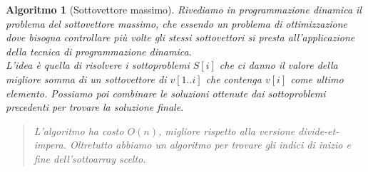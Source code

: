 \documentclass[oneside]{book}
\newtheorem{alg}{Algoritmo}
\begin{document}
\begin{alg}[Sottovettore massimo]
  Rivediamo in programmazione dinamica il problema del sottovettore massimo, che
  essendo un problema di ottimizzazione dove bisogna controllare pi\`u volte gli
  stessi sottovettori si presta all'applicazione della tecnica di programmazione
  dinamica. \\
  L'idea \`e quella di risolvere i sottoproblemi $S[i]$ che ci danno il valore
  della migliore somma di un sottovettore di $v[1..i]$ che contenga $v[i]$ come
  ultimo elemento. Possiamo poi combinare le soluzioni ottenute dai
  sottoproblemi precedenti per trovare la soluzione finale.

  \begin{algorithm}[H]

    \;
  \end{algorithm}
  \begin{quote}
    L'algoritmo ha costo $O(n)$, migliore rispetto alla versione divide-et-impera.
    Oltretutto abbiamo un algoritmo per trovare gli indici di inizio e fine
    dell'sottoarray scelto.
  \end{quote}
\end{alg}

\pagebreak
\end{document}
